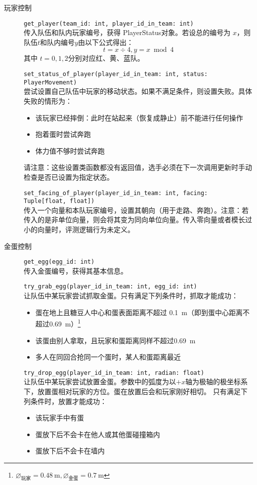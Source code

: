 \documentclass{article}
\begin{document}
\begin{description}
\item[玩家控制] \lstinline{get_player(team_id: int, player_id_in_team: int)}\\[-2pt]
传入队伍和队内玩家编号，获得 PlayerStatus对象。若设总的编号为 $x$，则队伍$t$和队内编号$y$由以下公式得出：
\[t = x \div 4, y = x \bmod 4\]
其中 $t=0,1,2$分别对应红、黄、蓝队。

\lstinline{set_status_of_player(player_id_in_team: int, status: PlayerMovement)}\\[-2pt]
尝试设置自己队伍中玩家的移动状态。如果不满足条件，则设置失败。具体失败的情形为：
\begin{itemize}\setlength\itemsep{0em}
\item 该玩家已经摔倒：此时在站起来（恢复成静止）前不能进行任何操作
\item 抱着蛋时尝试奔跑
\item 体力值不够时尝试奔跑
\end{itemize}

请注意：这些设置类函数\color{red}都没有返回值\color{black}，选手必须在下一次调用更新时手动检查是否已设置为指定状态。

\lstinline{set_facing_of_player(player_id_in_team: int, facing: Tuple[float, float])}\\[-2pt]
传入一个向量和本队玩家编号，设置其朝向（用于走路、奔跑）。注意：若传入的是非单位向量，则会将其变为同向单位向量。传入零向量或者模长过小的向量时，评测逻辑行为未定义。

\item[金蛋控制] \lstinline{get_egg(egg_id: int)}\\[-2pt]
传入金蛋编号，获得其基本信息。

\lstinline{try_grab_egg(player_id_in_team: int, egg_id: int)}\\[-2pt]
让队伍中某玩家尝试抓取金蛋。只有满足下列条件时，抓取才能成功：

\begin{itemize}\setlength\itemsep{0em}
\item 蛋在地上且糖豆人中心和蛋表面距离不超过 \SI{0.1}{\meter}（即到蛋中心距离不超过\SI{0.69}{\meter}）\footnote{$\diameter_{\text{玩家}}=\SI{0.48}{\meter},\diameter_{\text{金蛋}}=\SI{0.7}{\meter}$}
\item 该蛋由别人拿取，且玩家和蛋距离同样不超过\SI{0.69}{\meter}
\item 多人在同回合抢同一个蛋时，某人和蛋距离最近
\end{itemize}

\lstinline{try_drop_egg(player_id_in_team: int, radian: float)}\\[-2pt]
让队伍中某玩家尝试放置金蛋。参数中的弧度为以$+x$轴为极轴的极坐标系下，放置蛋相对玩家的方位。蛋在放置后会和玩家刚好相切。
只有满足下列条件时，放置才能成功：

\begin{itemize}\setlength\itemsep{0em}
\item 该玩家手中有蛋
\item 蛋放下后不会卡在他人或其他蛋碰撞箱内
\item 蛋放下后不会卡在墙内
\end{itemize}

\end{description}
\end{document}
